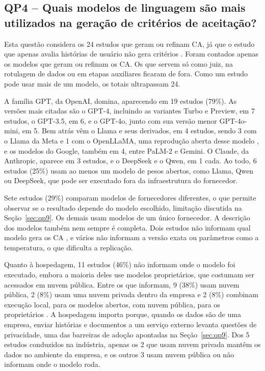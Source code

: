 \subsection{QP4 -- Quais modelos de linguagem são mais utilizados na geração de critérios de aceitação?}
\label{sec:qp4}

Esta questão considera os 24 estudos que geram ou refinam CA, já que o estudo que apenas avalia histórias de usuário não gera critérios \cite{ma2026}. Foram contados apenas os modelos que geram ou refinam os CA. Os que servem só como juiz, na rotulagem de dados ou em etapas auxiliares ficaram de fora. Como um estudo pode usar mais de um modelo, os totais ultrapassam 24.

A família GPT, da OpenAI, domina, aparecendo em 19 estudos (79\%). As versões mais citadas são o GPT-4, incluindo as variantes Turbo e Preview, em 7 estudos, o GPT-3.5, em 6, e o GPT-4o, junto com sua versão menor GPT-4o-mini, em 5. Bem atrás vêm o Llama e seus derivados, em 4 estudos, sendo 3 com o Llama da Meta e 1 com o OpenLLaMA, uma reprodução aberta desse modelo \cite{li2024}, e os modelos do Google, também em 4, entre PaLM-2 e Gemini. O Claude, da Anthropic, aparece em 3 estudos, e o DeepSeek e o Qwen, em 1 cada. Ao todo, 6 estudos (25\%) usam ao menos um modelo de pesos abertos, como Llama, Qwen ou DeepSeek, que pode ser executado fora da infraestrutura do fornecedor.

Sete estudos (29\%) comparam modelos de fornecedores diferentes, o que permite observar se o resultado depende do modelo escolhido, limitação discutida na Seção~\ref{sec:qp9}. Os demais usam modelos de um único fornecedor. A descrição dos modelos também nem sempre é completa. Dois estudos não informam qual modelo gera os CA \cite{lotfi2025,karimi2026}, e vários não informam a versão exata ou parâmetros como a temperatura, o que dificulta a replicação.

Quanto à hospedagem, 11 estudos (46\%) não informam onde o modelo foi executado, embora a maioria deles use modelos proprietários, que costumam ser acessados em nuvem pública. Entre os que informam, 9 (38\%) usam nuvem pública, 2 (8\%) usam uma nuvem privada dentro da empresa \cite{baker2026,ferreira2025} e 2 (8\%) combinam execução local, para os modelos abertos, com nuvem pública, para os proprietários \cite{li2024,huang2026}. A hospedagem importa porque, quando os dados são de uma empresa, enviar histórias e documentos a um serviço externo levanta questões de privacidade, uma das barreiras de adoção apontadas na Seção~\ref{sec:qp9}. Dos 5 estudos conduzidos na indústria, apenas os 2 que usam nuvem privada mantêm os dados no ambiente da empresa, e os outros 3 usam nuvem pública ou não informam onde o modelo roda.

